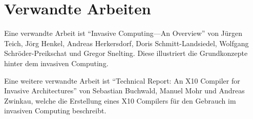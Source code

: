 \section{Verwandte Arbeiten}

Eine verwandte Arbeit ist "`Invasive Computing—An Overview"'\cite{invasiveOverview}
von Jürgen Teich, Jörg Henkel, Andreas Herkersdorf, Doris Schmitt-Landsiedel, Wolfgang Schröder-Preikschat
und Gregor Snelting. Diese illustriert die Grundkonzepte hinter dem invasiven Computing.

Eine weitere verwandte Arbeit ist "`Technical Report: An X10 Compiler for Invasive Architectures"'\cite{invasiveX10} 
von Sebastian Buchwald, Manuel Mohr und Andreas Zwinkau, welche die Erstellung eines X10 Compilers für den Gebrauch 
im invasiven Computing beschreibt.
